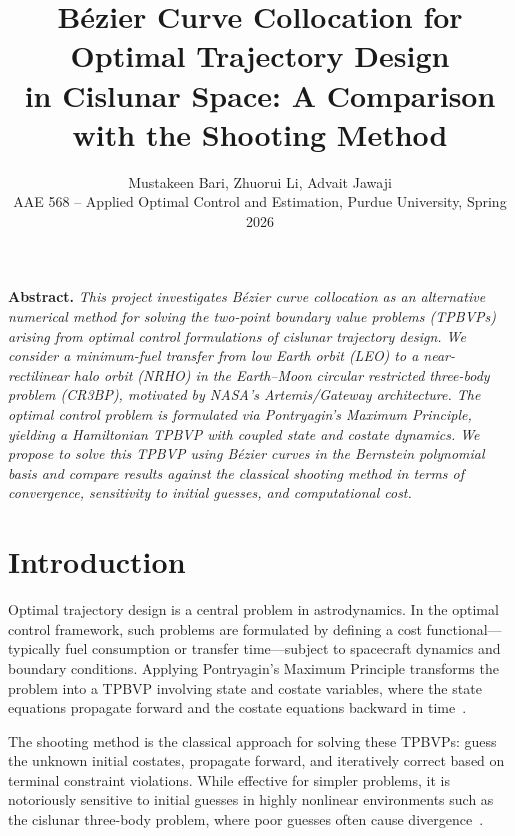 \documentclass[11pt]{article}
\title{B\'{e}zier Curve Collocation for Optimal Trajectory Design\\in Cislunar Space: A Comparison with the Shooting Method}
\author{Mustakeen Bari, Zhuorui Li, Advait Jawaji\\
\small AAE 568 -- Applied Optimal Control and Estimation, Purdue University, Spring 2026}
\date{}
\renewenvironment{abstract}{%
  \vspace{0.5em}\noindent\textbf{Abstract.}\itshape\small}{\par\vspace{0.5em}}
\begin{document}
\maketitle

\begin{abstract}
This project investigates B\'{e}zier curve collocation as an alternative numerical method for solving the two-point boundary value problems (TPBVPs) arising from optimal control formulations of cislunar trajectory design. We consider a minimum-fuel transfer from low Earth orbit (LEO) to a near-rectilinear halo orbit (NRHO) in the Earth--Moon circular restricted three-body problem (CR3BP), motivated by NASA's Artemis/Gateway architecture. The optimal control problem is formulated via Pontryagin's Maximum Principle, yielding a Hamiltonian TPBVP with coupled state and costate dynamics. We propose to solve this TPBVP using B\'{e}zier curves in the Bernstein polynomial basis and compare results against the classical shooting method in terms of convergence, sensitivity to initial guesses, and computational cost.
\end{abstract}

\section{Introduction}

Optimal trajectory design is a central problem in astrodynamics. In the optimal control framework, such problems are formulated by defining a cost functional---typically fuel consumption or transfer time---subject to spacecraft dynamics and boundary conditions. Applying Pontryagin's Maximum Principle transforms the problem into a TPBVP involving state and costate variables, where the state equations propagate forward and the costate equations backward in time~\cite{bryson1975applied, pontryagin1962}.

The shooting method is the classical approach for solving these TPBVPs: guess the unknown initial costates, propagate forward, and iteratively correct based on terminal constraint violations. While effective for simpler problems, it is notoriously sensitive to initial guesses in highly nonlinear environments such as the cislunar three-body problem, where poor guesses often cause divergence~\cite{choi2025bezier}.
\end{document}
